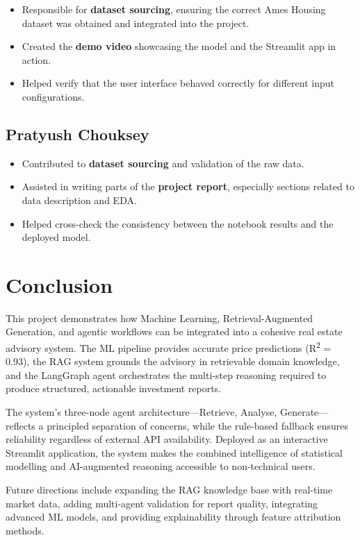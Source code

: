 \documentclass[11pt,a4paper]{article}
\begin{document}
\begin{itemize}[leftmargin=*]
    \item Responsible for \textbf{dataset sourcing}, ensuring the correct Ames Housing dataset was obtained and integrated into the project.
    \item Created the \textbf{demo video} showcasing the model and the Streamlit app in action.
    \item Helped verify that the user interface behaved correctly for different input configurations.
\end{itemize}

\subsection*{Pratyush Chouksey}

\begin{itemize}[leftmargin=*]
    \item Contributed to \textbf{dataset sourcing} and validation of the raw data.
    \item Assisted in writing parts of the \textbf{project report}, especially sections related to data description and EDA.
    \item Helped cross-check the consistency between the notebook results and the deployed model.
\end{itemize}

\section{Conclusion}

This project demonstrates how Machine Learning, Retrieval-Augmented Generation, and agentic workflows can be integrated into a cohesive real estate advisory system.
The ML pipeline provides accurate price predictions (R\textsuperscript{2} = 0.93), the RAG system grounds the advisory in retrievable domain knowledge, and the LangGraph agent orchestrates the multi-step reasoning required to produce structured, actionable investment reports.

The system's three-node agent architecture---Retrieve, Analyse, Generate---reflects a principled separation of concerns, while the rule-based fallback ensures reliability regardless of external API availability.
Deployed as an interactive Streamlit application, the system makes the combined intelligence of statistical modelling and AI-augmented reasoning accessible to non-technical users.

Future directions include expanding the RAG knowledge base with real-time market data, adding multi-agent validation for report quality, integrating advanced ML models, and providing explainability through feature attribution methods.
\end{document}
